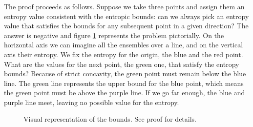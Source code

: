 The proof proceeds as follows. Suppose we take three points and assign them an entropy value consistent with the entropic bounds: can we always pick an entropy value that satisfies the bounds for any subsequent point in a given direction? The answer is negative and figure \ref{pm-es-directionallyBound} represents the problem pictorially. On the horizontal axis we can imagine all the ensembles over a line, and on the vertical axis their entropy. We fix the entropy for the origin, the blue and the red point. What are the values for the next point, the green one, that satisfy the entropy bounds? Because of strict concavity, the green point must remain below the blue line. The green line represents the upper bound for the blue point, which means the green point must be above the purple line. If we go far enough, the blue and purple line meet, leaving no possible value for the entropy.

\begin{figure}[H]
	\centering
	\caption{Visual representation of the bounds. See proof for details.}\label{pm-es-directionallyBound}
\end{figure}

